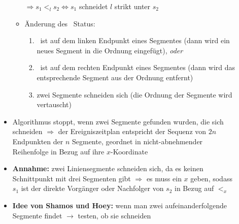 \begin{description}
\begin{itemize}
\begin{itemize}
					$\Rightarrow s_1 <_l s_2 \Longleftrightarrow s_1$ schneidet $l$ strikt unter $s_2$
					\item Änderung des \sweep~Status:
						\begin{enumerate}
							\item \sweep~ist auf dem linken Endpunkt eines Segmentes  (dann wird ein neues Segment in die Ordnung eingefügt), \textit{oder}
							\item \sweep~ist auf dem rechten Endpunkt eines Segmentes  (dann wird das entsprechende Segment aus der Ordnung entfernt)
							\item zwei Segmente schneiden sich (die Ordnung der Segmente wird vertauscht)
						\end{enumerate}
				\end{itemize}
			\item Algorithmus stoppt, wenn zwei Segmente gefunden wurden, die sich schneiden $\Rightarrow$ der Ereigniszeitplan entspricht der Sequenz von $2n$ Endpunkten der $n$ Segmente, geordnet in nicht-abnehmender Reihenfolge in Bezug auf ihre $x$-Koordinate
			\item \textbf{Annahme:} zwei Liniensegmente schneiden sich, da es keinen Schnittpunkt mit drei Segmenten gibt $\Rightarrow$ es muss ein $x$ geben, sodass $s_1$ ist der direkte Vorgänger oder Nachfolger von $s_2$ in Bezug auf $<_x$
			\item \textbf{Idee von Shamos und Hoey:} wenn man zwei aufeinanderfolgende Segmente findet $\rightarrow$ testen, ob sie schneiden
		\end{itemize}
\end{description}
\topbreak
\up\up
